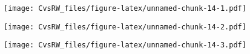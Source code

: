\documentclass[
]{article}
\newenvironment{Shaded}{\begin{snugshade}}{\end{snugshade}}
\newcommand{\DataTypeTok}[1]{\textcolor[rgb]{0.13,0.29,0.53}{#1}}
\newcommand{\FloatTok}[1]{\textcolor[rgb]{0.00,0.00,0.81}{#1}}
\newcommand{\KeywordTok}[1]{\textcolor[rgb]{0.13,0.29,0.53}{\textbf{#1}}}
\newcommand{\NormalTok}[1]{#1}
\newcommand{\OperatorTok}[1]{\textcolor[rgb]{0.81,0.36,0.00}{\textbf{#1}}}
\newcommand{\StringTok}[1]{\textcolor[rgb]{0.31,0.60,0.02}{#1}}
\begin{document}
\texttt{[image: CvsRW\_files/figure-latex/unnamed-chunk-14-1.pdf]}

\begin{Shaded}
\end{Shaded}

\texttt{[image: CvsRW\_files/figure-latex/unnamed-chunk-14-2.pdf]}

\begin{Shaded}
\end{Shaded}

\texttt{[image: CvsRW\_files/figure-latex/unnamed-chunk-14-3.pdf]}
\end{document}
